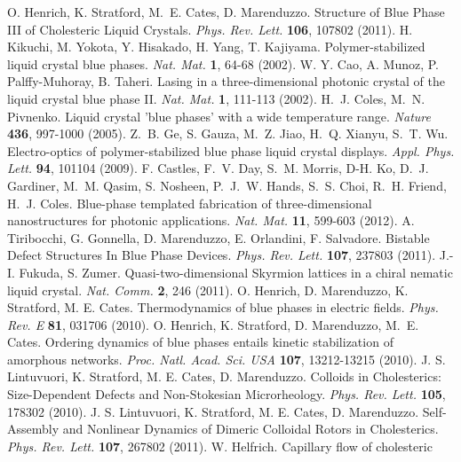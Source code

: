 \documentclass[12pt]{article}
\begin{document}
\begin{thebibliography}{99}
 O. Henrich, K. Stratford, M.~E. Cates, D. Marenduzzo.
 Structure of Blue Phase III of Cholesteric Liquid Crystals.
{\it Phys. Rev. Lett.} {\bf 106}, 107802 (2011).
 H. Kikuchi, M. Yokota, Y. Hisakado, H. Yang, T. Kajiyama.
Polymer-stabilized liquid crystal blue phases.
{\it Nat. Mat.} {\bf 1}, 64-68 (2002).
 W. Y. Cao, A. Munoz, P. Palffy-Muhoray, B. Taheri.
Lasing in a three-dimensional photonic crystal of the liquid crystal blue 
phase II. {\it Nat. Mat.} {\bf 1}, 111-113 (2002).
 H.~J. Coles, M.~N. Pivnenko.
Liquid crystal 'blue phases' with a wide temperature range.
{\it Nature} {\bf 436}, 997-1000 (2005).
 Z.~B. Ge, S. Gauza, M.~Z. Jiao, H.~Q. Xianyu, S.~T. Wu.
 Electro-optics of polymer-stabilized blue phase liquid crystal displays.
{\it Appl. Phys. Lett.} {\bf 94}, 101104 (2009).
 F. Castles, F.~V. Day, S.~M. Morris, D-H. Ko, D.~J. Gardiner, M.~M. Qasim, S. Nosheen, P.~J.~W. Hands, S.~S. Choi, R.~H. Friend, H.~J. Coles.
Blue-phase templated fabrication of three-dimensional nanostructures for photonic applications. {\it Nat. Mat.} {\bf 11}, 599-603 (2012).
 A. Tiribocchi, G. Gonnella, D. Marenduzzo, E. Orlandini,
F. Salvadore. Bistable Defect Structures In Blue Phase Devices. 
 {\it Phys. Rev. Lett.} {\bf 107}, 237803 (2011).
 J.-I. Fukuda, S. Zumer.
Quasi-two-dimensional Skyrmion lattices in a chiral nematic liquid crystal. 
{\it Nat. Comm.} {\bf 2}, 246 (2011).
  O. Henrich, D. Marenduzzo, K. Stratford, 
M. E. Cates. Thermodynamics of blue phases in electric fields.
{\it Phys. Rev. E} {\bf 81}, 031706 (2010).
 O. Henrich, K. Stratford, D. Marenduzzo, M.~E. Cates.
 Ordering dynamics of blue phases entails kinetic stabilization of amorphous networks. {\it Proc. Natl. Acad. Sci. USA} {\bf 107}, 13212-13215 (2010).
 J. S. Lintuvuori, K. Stratford, M. E. Cates,
D. Marenduzzo.   Colloids in Cholesterics: Size-Dependent Defects and Non-Stokesian Microrheology. {\it Phys. Rev. Lett.} {\bf 105}, 178302 (2010).
  J. S. Lintuvuori, K. Stratford, M. E. Cates,
D. Marenduzzo. 
Self-Assembly and Nonlinear Dynamics of Dimeric Colloidal Rotors in 
Cholesterics. {\it Phys. Rev. Lett.} {\bf 107}, 267802 (2011).
 	W. Helfrich. Capillary flow of cholesteric

\end{thebibliography}
\end{document}
